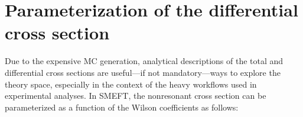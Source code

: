 \section{Parameterization of the differential cross section}
\label{sec:parameterization}

Due to the expensive MC generation, analytical descriptions of the total and differential cross sections are useful---if not mandatory---ways to explore the theory space, especially in the context of the heavy workflows used in experimental analyses. In SMEFT, the nonresonant \ggHH cross section can be parameterized as a function of the Wilson coefficients as follows:

